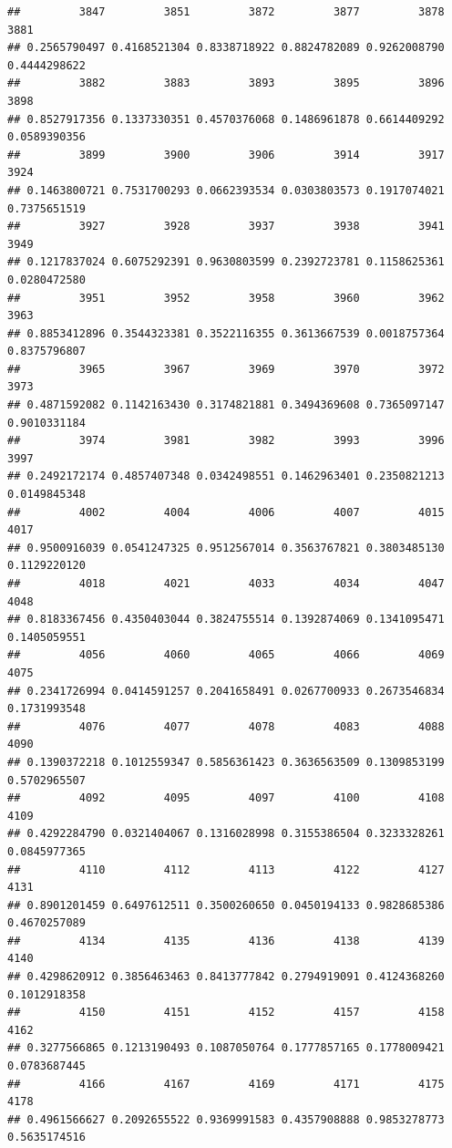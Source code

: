 \documentclass[
]{article}
\begin{document}
\begin{verbatim}
##         3847         3851         3872         3877         3878         3881 
## 0.2565790497 0.4168521304 0.8338718922 0.8824782089 0.9262008790 0.4444298622 
##         3882         3883         3893         3895         3896         3898 
## 0.8527917356 0.1337330351 0.4570376068 0.1486961878 0.6614409292 0.0589390356 
##         3899         3900         3906         3914         3917         3924 
## 0.1463800721 0.7531700293 0.0662393534 0.0303803573 0.1917074021 0.7375651519 
##         3927         3928         3937         3938         3941         3949 
## 0.1217837024 0.6075292391 0.9630803599 0.2392723781 0.1158625361 0.0280472580 
##         3951         3952         3958         3960         3962         3963 
## 0.8853412896 0.3544323381 0.3522116355 0.3613667539 0.0018757364 0.8375796807 
##         3965         3967         3969         3970         3972         3973 
## 0.4871592082 0.1142163430 0.3174821881 0.3494369608 0.7365097147 0.9010331184 
##         3974         3981         3982         3993         3996         3997 
## 0.2492172174 0.4857407348 0.0342498551 0.1462963401 0.2350821213 0.0149845348 
##         4002         4004         4006         4007         4015         4017 
## 0.9500916039 0.0541247325 0.9512567014 0.3563767821 0.3803485130 0.1129220120 
##         4018         4021         4033         4034         4047         4048 
## 0.8183367456 0.4350403044 0.3824755514 0.1392874069 0.1341095471 0.1405059551 
##         4056         4060         4065         4066         4069         4075 
## 0.2341726994 0.0414591257 0.2041658491 0.0267700933 0.2673546834 0.1731993548 
##         4076         4077         4078         4083         4088         4090 
## 0.1390372218 0.1012559347 0.5856361423 0.3636563509 0.1309853199 0.5702965507 
##         4092         4095         4097         4100         4108         4109 
## 0.4292284790 0.0321404067 0.1316028998 0.3155386504 0.3233328261 0.0845977365 
##         4110         4112         4113         4122         4127         4131 
## 0.8901201459 0.6497612511 0.3500260650 0.0450194133 0.9828685386 0.4670257089 
##         4134         4135         4136         4138         4139         4140 
## 0.4298620912 0.3856463463 0.8413777842 0.2794919091 0.4124368260 0.1012918358 
##         4150         4151         4152         4157         4158         4162 
## 0.3277566865 0.1213190493 0.1087050764 0.1777857165 0.1778009421 0.0783687445 
##         4166         4167         4169         4171         4175         4178 
## 0.4961566627 0.2092655522 0.9369991583 0.4357908888 0.9853278773 0.5635174516 

\end{verbatim}
\end{document}
